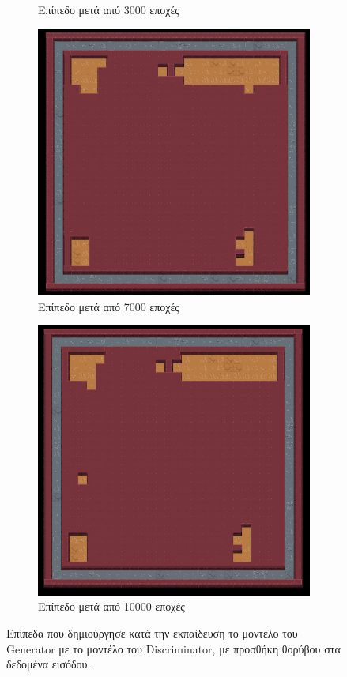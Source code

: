 \begin{figure}[H]
\begin{subfigure}{.5\textwidth}
  \caption{Επίπεδο μετά από 3000 εποχές}
  \label{fig:sfig2}
\end{subfigure}
\begin{subfigure}{.5\textwidth}
  \centering
  \includegraphics[width=.8\linewidth]{../images/result_images/dense-gan-with-fuzzy/combined_7000.png}
  \caption{Επίπεδο μετά από 7000 εποχές}
  \label{fig:sfig2}
\end{subfigure}
\begin{subfigure}{.5\textwidth}
  \centering
  \includegraphics[width=.8\linewidth]{../images/result_images/dense-gan-with-fuzzy/combined_10000.png}
  \caption{Επίπεδο μετά από 10000 εποχές}
  \label{fig:sfig2}
\end{subfigure}
\caption{Επίπεδα που δημιούργησε κατά την εκπαίδευση το μοντέλο του Generator με το μοντέλο του Discriminator, με προσθήκη θορύβου στα δεδομένα εισόδου.}
\label{fig:fig}
\end{figure}

